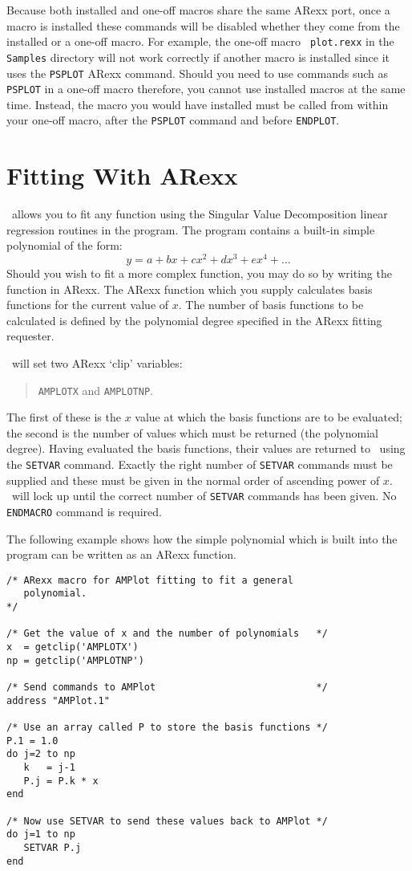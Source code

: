 Because both installed and one-off macros share the same ARexx port, once 
a macro is installed these commands will be disabled whether they come 
from the installed or a one-off macro. For example, the one-off macro {\tt
plot.rexx} in the {\tt Samples} directory will not work correctly if another 
macro is installed since it uses the {\tt PSPLOT} ARexx command. Should you need 
to use commands such as {\tt PSPLOT} in a one-off macro therefore, you cannot use 
installed macros at the same time. Instead, the macro you would have installed 
must be called from within your one-off macro, after the {\tt PSPLOT} command and 
before {\tt ENDPLOT}.

\section{Fitting With ARexx}
\amplot\ allows you to fit any function using the 
Singular Value Decomposition 
linear regression routines in the program. The program contains a built-in simple 
polynomial of the form:
$$ y = a + bx + cx^2 + dx^3 + ex^4 + \ldots $$
Should you wish to fit a more complex function, you may do so by writing the 
function in ARexx. The ARexx function which you supply calculates basis functions 
for the current value of $x$. The number of basis functions to be calculated is 
defined by the polynomial degree specified in the ARexx fitting requester.

\amplot\ will set two ARexx `clip' variables: 
\begin{quote}
{\tt AMPLOTX} and {\tt AMPLOTNP}. 
\end{quote}
The first of these is the $x$ value at which the basis functions are to be evaluated; 
the second is the number of values which must be returned (the polynomial degree).
Having evaluated the basis functions, their values are returned to \amplot\ using 
the {\tt SETVAR} command. Exactly the right number of {\tt SETVAR} commands must be 
supplied and these must be given in the normal order of ascending power of $x$.
\amplot\ will lock up until the correct number of {\tt SETVAR} commands has been 
given. No {\tt ENDMACRO} command is required.

The following example shows how the simple polynomial which is built into the 
program can be written as an ARexx function.

\begin{verbatim}
/* ARexx macro for AMPlot fitting to fit a general
   polynomial.
*/

/* Get the value of x and the number of polynomials   */
x  = getclip('AMPLOTX')
np = getclip('AMPLOTNP')

/* Send commands to AMPlot                            */
address "AMPlot.1"

/* Use an array called P to store the basis functions */
P.1 = 1.0
do j=2 to np
   k   = j-1
   P.j = P.k * x
end

/* Now use SETVAR to send these values back to AMPlot */
do j=1 to np
   SETVAR P.j
end
\end{verbatim}
\newpage

